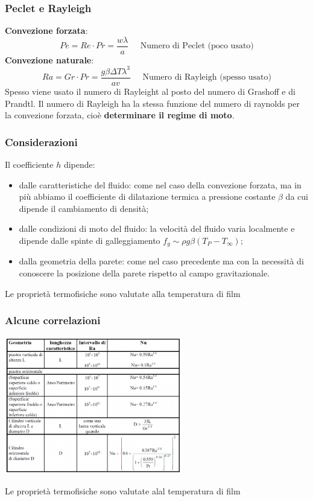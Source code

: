 \subsubsection{Peclet e Rayleigh}
\textbf{Convezione forzata}:
\[
    Pe = Re \cdot Pr = \frac{w \lambda}{a} \;\;\;\;\;\text{Numero di Peclet (poco usato)}
\]
\textbf{Convezione naturale}:
\[
    Ra = Gr \cdot Pr = \frac{g \beta \Delta T \lambda^3}{a v} \;\;\;\;\; \text{Numero di Rayleigh (spesso usato)}
\]
Spesso viene usato il numero di Rayleight al posto del numero di Grashoff e di Prandtl.\newline
\newline
Il numero di Rayleigh ha la stessa funzione del numero di raynolds per la convezione forzata, cioè \textbf{determinare il regime di moto}.
\subsubsection{Considerazioni}
Il coefficiente $h$ dipende:
\begin{itemize}
    \item dalle caratteristiche del fluido: come nel caso della convezione forzata, ma in
    più abbiamo il coefficiente di dilatazione termica a pressione costante $\beta$ da cui
    dipende il cambiamento di densità;
    \item dalle condizioni di moto del fluido: la velocità del fluido varia localmente e
    dipende dalle spinte di galleggiamento $f_g \sim \rho g \beta (T_P- T_{\infty})$;
    \item dalla geometria della parete: come nel caso precedente ma con la necessità di
    conoscere la posizione della parete rispetto al campo gravitazionale.    
\end{itemize}
Le proprietà termofisiche sono valutate alla temperatura di film
\subsubsection{Alcune correlazioni}
\begin{center}
    \includegraphics[height=6cm]{../L11/img5.PNG}
\end{center}
Le proprietà termofisiche sono valutate alal temperatura di film